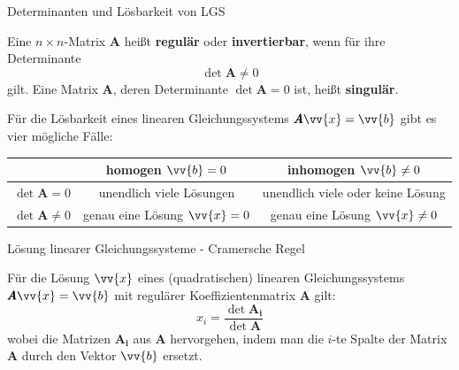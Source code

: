 \begin{frame}{Determinanten und Lösbarkeit von LGS}
	\begin{definition}
		Eine $n \times n$-Matrix $\pmb{A}$ heißt \textbf{regulär} oder \textbf{invertierbar}, wenn für ihre Determinante
		\[
		\det \pmb{A} \neq 0
		\]
		gilt.
		Eine Matrix $\pmb{A}$, deren Determinante $\det \pmb{A} = 0$ ist, heißt \textbf{singulär}.
	\end{definition}
	Für die Lösbarkeit eines linearen Gleichungssystems $\pmb{A}\vv{x} = \vv{b}$ gibt es vier mögliche Fälle:
	\small{
	\begin{tabular}{|c|c|c|}
		\hline
		& homogen $\vv{b}=0$ & inhomogen $\vv{b} \neq 0$ \\
		\hline
		$\det \pmb{A} = 0$ & unendlich viele Lösungen & unendlich viele oder keine Lösung \\
		\hline
		$\det \pmb{A} \neq 0$ & genau eine Lösung $\vv{x}=0$ & genau eine Lösung $\vv{x} \neq 0$\\
		\hline
	\end{tabular}}
\end{frame}

\begin{frame}{Lösung linearer Gleichungssysteme - Cramersche Regel}
	\begin{theorem}
	Für die Lösung $\vv{x}$ eines (quadratischen) linearen Gleichungssystems $\pmb{A} \vv{x} = \vv{b}$ mit regulärer Koeffizientenmatrix $\pmb{A}$ gilt:
	\[
	x_{i} = \frac{\det \pmb{A_{i}}}{\det \pmb{A}}
	\]
	wobei die Matrizen $\pmb{A_{i}}$ aus $\pmb{A}$ hervorgehen, indem man die $i$-te Spalte der Matrix $\pmb{A}$ durch den Vektor $\vv{b}$ ersetzt.
 	\end{theorem}
\end{frame}

